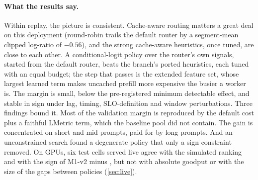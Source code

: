 \paragraph{What the results say.}
Within replay, the picture is consistent. Cache-aware routing matters a great deal on this deployment
(round-robin trails the default router by a segment-mean clipped log-ratio of $-0.56$), and the strong cache-aware
heuristics, once tuned, are close to each other. A conditional-logit policy over the router's own
signals, started from the default router, beats the branch's ported heuristics, each tuned with an
equal budget; the step that passes is the extended feature set, whose largest learned
term makes uncached prefill more expensive the busier a worker is. The margin is small, below the
pre-registered minimum detectable effect, and stable in sign under lag, timing, SLO-definition and
window perturbations. Three findings bound it. Most of the validation margin is reproduced by the
default cost plus a faithful LMetric term, which the baseline pool did not contain. The gain is concentrated on short and mid
prompts, paid for by long prompts. And an unconstrained search found a degenerate policy that only a
sign constraint removed. On GPUs, six test cells served live agree with the simulated ranking and
with the sign of M1-v2 minus , but not with absolute goodput or with the size of the gaps
between policies (\cref{sec:live}).

